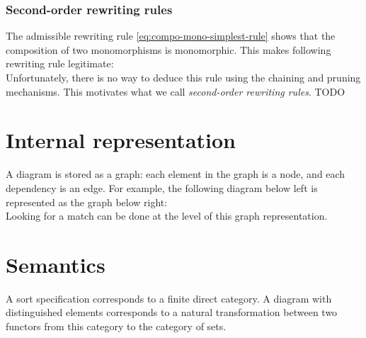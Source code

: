 \documentclass{article}
\begin{document}
\subsubsection{Second-order rewriting rules}
The admissible rewriting rule \eqref{eq:compo-mono-simplest-rule} shows that the composition of two monomorphisms is monomorphic.
This makes following rewriting rule legitimate:
\[

\]
Unfortunately, there is no way to deduce this rule using the chaining and pruning mechanisms.
This motivates what we call \emph{second-order rewriting rules}.
TODO
\section{Internal representation}
A diagram is stored as a graph: 
each element in the graph is a node, and each dependency is an edge.
For example, the following diagram below left is represented as the graph below right:
\[

\]
Looking for a match can be done at the level of this graph representation.
\section{Semantics}
A sort specification corresponds to a finite direct category. 
A diagram with distinguished elements corresponds to a 
natural transformation between two functors from this category to the category of sets.
\end{document}
